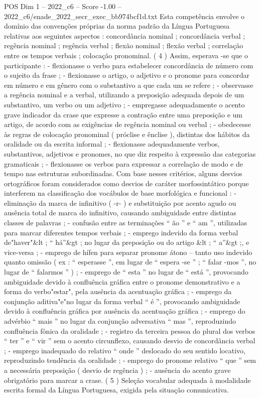 \begin{textsample}{POS Dim 1 – 2022\_c6 – Score -1.00 – 2022\_c6/enade\_2022\_secr\_exec\_bb974bcf1d.txt}
Esta competência envolve o domínio das convenções próprias da norma padrão da Língua Portuguesa relativas aos seguintes aspectos : concordância nominal ; concordância verbal ; regência nominal ; regência verbal ; flexão nominal ; flexão verbal ; correlação entre os tempos verbais ; colocação pronominal. ( 4 ) Assim, esperava -se que o participante : - flexionasse o verbo para estabelecer concordância de número com o sujeito da frase ; - flexionasse o artigo, o adjetivo e o pronome para concordar em número e em gênero com o substantivo a que cada um se refere ; - observasse a regência nominal e a verbal, utilizando a preposição adequada depois de um substantivo, um verbo ou um adjetivo ; - empregasse adequadamente o acento grave indicador da crase que expresse a contração entre uma preposição e um artigo, de acordo com as exigências de regência nominal ou verbal ; - obedecesse às regras de colocação pronominal ( próclise e ênclise ), distintas dos hábitos da oralidade ou da escrita informal ; - flexionasse adequadamente verbos, substantivos, adjetivos e pronomes, no que diz respeito à expressão das categorias gramaticais ; - flexionasse os verbos para expressar a correlação de modo e de tempo nas estruturas subordinadas.
Com base nesses critérios, alguns desvios ortográficos foram considerados como desvios de caráter morfossintático porque interferem na classificação dos vocábulos de base morfológica e funcional : - eliminação da marca de infinitivo ( -r- ) e substituição por acento agudo ou ausência total de marca do infinitivo, causando ambiguidade entre distintas classes de palavras ; - confusão entre as terminações “ ão ” e “ am ”, utilizadas para marcar diferentes tempos verbais ; - emprego indevido da forma verbal de"haver"\&lt ; “ há”\&gt ; no lugar da preposição ou do artigo \&lt ; “ a”\&gt ;, e vice-versa ; - emprego de hífen para separar pronome átono – tanto uso indevido quanto omissão ( ex : “ esperasse ”, em lugar de “ espera -se ” ; “ falar -mos ”, no lugar de “ falarmos ” ) ; - emprego de “ esta ” no lugar de “ está ”, provocando ambiguidade devido à confluência gráfica entre o pronome demonstrativo e a forma do verbo"estar", pela ausência da acentuação gráfica ; - emprego da conjunção aditiva"e"no lugar da forma verbal “ é ”, provocando ambiguidade devido à confluência gráfica por ausência da acentuação gráfica ; - emprego do advérbio “ mais ” no lugar da conjunção adversativa “ mas ”, reproduzindo confluência fônica da oralidade ; - registro da terceira pessoa do plural dos verbos “ ter ” e “ vir ” sem o acento circunflexo, causando desvio de concordância verbal ; - emprego inadequado do relativo “ onde ” deslocado do seu sentido locativo, reproduzindo tendência da oralidade ; - emprego do pronome relativo “ que ” sem a necessária preposição ( desvio de regência ) ; - ausência do acento grave obrigatório para marcar a crase. ( 5 ) Seleção vocabular adequada à modalidade escrita formal da Língua Portuguesa, exigida pela situação comunicativa.

\end{textsample}
